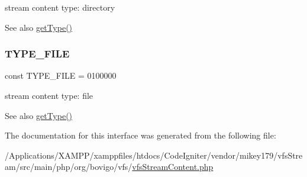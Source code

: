 stream content type\+: directory

\begin{DoxySeeAlso}{See also}
\mbox{\hyperlink{interfaceorg_1_1bovigo_1_1vfs_1_1vfs_stream_content_a830b5c75df72b32396701bc563fbe3c7}{get\+Type()}} 
\end{DoxySeeAlso}
\mbox{\label{interfaceorg_1_1bovigo_1_1vfs_1_1vfs_stream_content_a6e21fe27fed935d13d258f1b38282e08}} 
\subsubsection{\texorpdfstring{T\+Y\+P\+E\+\_\+\+F\+I\+LE}{TYPE\_FILE}}
{\footnotesize\ttfamily const T\+Y\+P\+E\+\_\+\+F\+I\+LE = 0100000}

stream content type\+: file

\begin{DoxySeeAlso}{See also}
\mbox{\hyperlink{interfaceorg_1_1bovigo_1_1vfs_1_1vfs_stream_content_a830b5c75df72b32396701bc563fbe3c7}{get\+Type()}} 
\end{DoxySeeAlso}


The documentation for this interface was generated from the following file\+:\begin{DoxyCompactItemize}
\item 
/\+Applications/\+X\+A\+M\+P\+P/xamppfiles/htdocs/\+Code\+Igniter/vendor/mikey179/vfs\+Stream/src/main/php/org/bovigo/vfs/\mbox{\hyperlink{vfs_stream_content_8php}{vfs\+Stream\+Content.\+php}}\end{DoxyCompactItemize}
